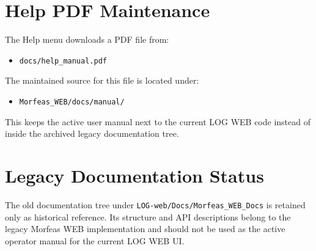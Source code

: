 \documentclass[11pt,a4paper]{article}
\begin{document}
\section{Help PDF Maintenance}
The Help menu downloads a PDF file from:

\begin{itemize}
\item \texttt{docs/help\_manual.pdf}
\end{itemize}

The maintained source for this file is located under:

\begin{itemize}
\item \texttt{Morfeas\_WEB/docs/manual/}
\end{itemize}

This keeps the active user manual next to the current LOG WEB code instead of inside the archived legacy documentation tree.

\section{Legacy Documentation Status}
The old documentation tree under \texttt{LOG-web/Docs/Morfeas\_WEB\_Docs} is retained only as historical reference. Its structure and API descriptions belong to the legacy Morfeas WEB implementation and should not be used as the active operator manual for the current LOG WEB UI.
\end{document}
